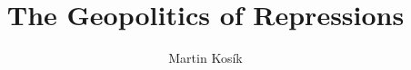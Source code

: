 \usepackage{url}
\usepackage[utf8]{inputenc}
\usepackage{amsmath}
\usepackage{color}
%


\renewcommand{\baselinestretch}{1.5} 
\hoffset -1.54cm \voffset -0.04pt \evensidemargin 1.5cm
\oddsidemargin 2.5cm \topmargin -1.6cm
\textheight 232mm \textwidth 136mm

\newcommand{\noop}[1]{} 
\newcommand\notype[1]{\unskip}




\title{The Geopolitics of Repressions}
\author{Martin Kosík}





\newpage
 \tableofcontents
\newpage
{}

